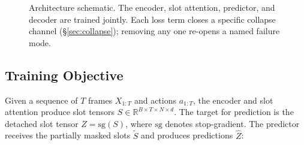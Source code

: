 \documentclass[12pt]{article}
\begin{document}
\begin{figure}[t]
\centering
\setlength{\fboxsep}{10pt}
\caption{Architecture schematic. The encoder, slot attention, predictor, and decoder are trained jointly. Each loss term closes a specific collapse channel (\S\ref{sec:collapse}); removing any one re-opens a named failure mode.}
\label{fig:arch}
\end{figure}

\subsection{Training Objective}

Given a sequence of $T$ frames $X_{1:T}$ and actions $a_{1:T}$, the encoder and slot attention produce slot tensors $S \in \mathbb{R}^{B \times T \times N \times d}$. The target for prediction is the detached slot tensor $Z = \text{sg}(S)$, where $\text{sg}$ denotes stop-gradient. The predictor receives the partially masked slots $\tilde{S}$ and produces predictions $\hat{Z}$:
\end{document}
